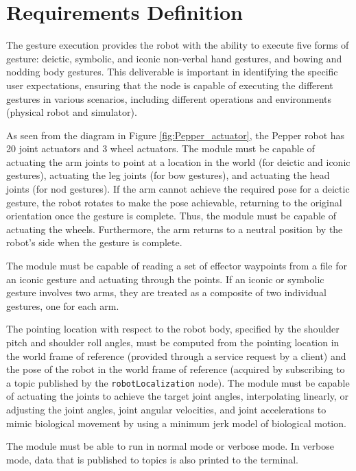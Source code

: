 \documentclass{CSSRforAfrica}
\begin{document}
\newpage

 

\section{Requirements Definition}
The gesture execution provides the robot with the ability to execute five forms of gesture: deictic, symbolic, and iconic non-verbal hand gestures, and bowing and nodding body gestures. This deliverable is important in identifying the specific user expectations, 
ensuring that the node is capable of executing the different gestures in various scenarios, including different
operations and environments (physical robot and simulator). 


As seen from the diagram in Figure \ref{fig:Pepper_actuator}, the Pepper robot has 20 joint actuators and 3 wheel actuators.
The module must be capable of actuating the arm joints to point at a location in the world (for deictic and iconic gestures), actuating the leg joints (for bow gestures), and actuating the head joints (for nod gestures).  If the arm cannot achieve the required pose for a deictic gesture, the robot rotates to make the pose achievable, returning to the original orientation once the gesture is complete. Thus, the module must be capable of actuating the wheels. Furthermore, the arm returns to a neutral position by the robot’s side when the gesture is complete. 

The module must be capable of reading a set of effector waypoints from a file for an iconic gesture and actuating through the points. If an iconic or symbolic gesture involves two arms, they are treated as a composite of two individual gestures, one for each arm.

The pointing location with respect to the robot body, specified by the shoulder pitch and shoulder roll angles, must be computed from the pointing location in the world frame of reference (provided through a service request by a client) and the pose of the robot in the world frame of reference (acquired by subscribing to a topic published by the \texttt{robotLocalization} node). The module must be capable of actuating the joints to achieve the target joint angles, interpolating linearly, or adjusting the joint angles, joint angular velocities, and joint accelerations to mimic biological movement by using a minimum jerk model of biological motion.

The module must be able to run in normal mode or verbose mode. In verbose mode, data that is published to
topics is also printed to the terminal.
\end{document}

